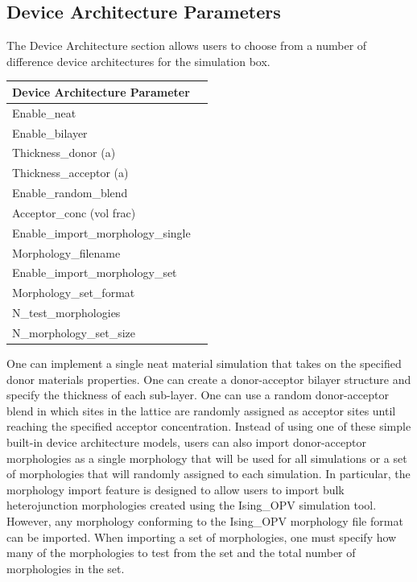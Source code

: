 \documentclass[%
 reprint,onecolumn,notitlepage,
superscriptaddress,longbibliography,
 amsmath,amssymb,
 aps,rmp,floatfix,
]{revtex4-1}
\begin{document}
\subsection{Device Architecture Parameters}

The Device Architecture section allows users to choose from a number of difference device architectures for the simulation box.

\begin{center}
\begin{tabular}{ l l }
\hline
Device Architecture Parameter & \\
\hline
Enable\_neat & \\
Enable\_bilayer & \\
Thickness\_donor (a) & \\
Thickness\_acceptor (a) & \\
Enable\_random\_blend & \\
Acceptor\_conc (vol frac) & \\
Enable\_import\_morphology\_single & \\
Morphology\_filename & \\
Enable\_import\_morphology\_set & \\
Morphology\_set\_format & \\
N\_test\_morphologies & \\
N\_morphology\_set\_size & \\
\end{tabular}
\end{center}

One can implement a single neat material simulation that takes on the specified donor materials properties.
One can create a donor-acceptor bilayer structure and specify the thickness of each sub-layer.
One can use a random donor-acceptor blend in which sites in the lattice are randomly assigned as acceptor sites until reaching the specified acceptor concentration.
Instead of using one of these simple built-in device architecture models, users can also import donor-acceptor morphologies as a single morphology that will be used for all simulations or a set of morphologies that will randomly assigned to each simulation. 
In particular, the morphology import feature is designed to allow users to import bulk heterojunction morphologies created using the Ising\_OPV simulation tool.\cite{heiber2018joss}
However, any morphology conforming to the Ising\_OPV morphology file format can be imported.
When importing a set of morphologies, one must specify how many of the morphologies to test from the set and the total number of morphologies in the set.
\end{document}
